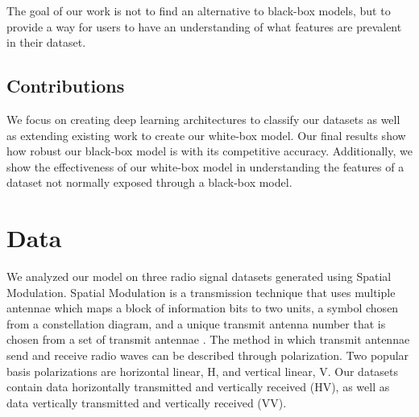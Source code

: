 \documentclass{turabian-thesis}
\begin{document}
The goal of our work is not to find an alternative to black-box models, but to provide a way for users to have an understanding of what features are prevalent in their dataset.


\section{Contributions}
We focus on creating deep learning architectures to classify our datasets as well as extending existing work to create our white-box model. Our final results show how robust our black-box model is with its competitive accuracy. Additionally, we show the effectiveness of our white-box model in understanding the features of a dataset not normally exposed through a black-box model.


\chapter{Data}

We analyzed our model on three radio signal datasets generated using Spatial Modulation. Spatial Modulation is a transmission technique that uses multiple antennae which maps a block of information bits to two units, a symbol chosen from a constellation diagram, and a unique transmit antenna number that is chosen from a set of transmit antennae \cite{mesleh_spatial_2008}. The method in which transmit antennae send and receive radio waves can be described through polarization. Two popular basis polarizations are horizontal linear, H, and vertical linear, V. Our datasets contain data horizontally transmitted and vertically received (HV), as well as data vertically transmitted and vertically received (VV).
\end{document}
